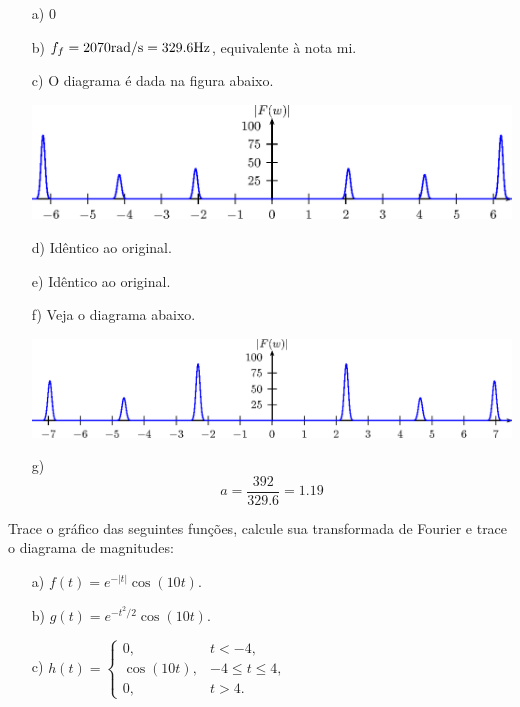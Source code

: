 \begin{resp}
\begin{itemize}
\item[a)] 0
\item[b)] $f_f=2070 \hbox{rad/s}=329.6 \hbox{Hz}$, equivalente à nota mi.
\item[c)] O diagrama é dada na figura abaixo.
\begin{center}
\includegraphics{cap_propriedades_transformada/pics/figura_22}\end{center}
\item[d)] Idêntico ao original.
\item[e)] Idêntico ao original.
\item[f)] Veja o diagrama abaixo.
\begin{center}
\includegraphics{cap_propriedades_transformada/pics/figura_23}\end{center}
\item[g)] \begin{equation}a=\frac{392}{329.6}=1.19\end{equation}
\end{itemize} 
\end{resp}
\begin{exer} Trace o gráfico das seguintes funções, calcule sua transformada de Fourier e trace o diagrama de magnitudes: 
\begin{itemize}
\item[a)] $f(t)=e^{-|t|}\cos(10t)$.
\item[b)] $g(t)=e^{-t^2/2}\cos(10t)$.
\item[c)] $h(t)=\left\{
\begin{array}{ll}
0, &t<-4,\\
\cos(10t), &-4\leq t \leq 4,\\
0,&t>4.
\end{array} \right.$
\end{itemize}
\end{exer}
